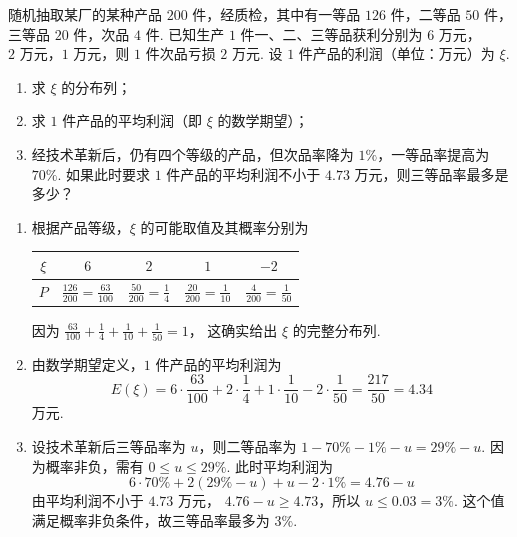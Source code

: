 \begin{problem}
随机抽取某厂的某种产品 \(200\text{ 件}\)，经质检，其中有一等品 \(126\text{ 件}\)，二等品 \(50\text{ 件}\)，三等品 \(20\text{ 件}\)，次品 \(4\text{ 件}\). 已知生产 \(1\text{ 件}\)一、二、三等品获利分别为 \(6\text{ 万元}\)，\(2\text{ 万元}\)，\(1\text{ 万元}\)，则 \(1\text{ 件}\)次品亏损 \(2\text{ 万元}\). 设 \(1\text{ 件}\)产品的利润（单位：万元）为 \(\xi\).

\begin{enumerate}
\item 求 \(\xi\) 的分布列；
\item 求 \(1\text{ 件}\)产品的平均利润（即 \(\xi\) 的数学期望）；
\item 经技术革新后，仍有四个等级的产品，但次品率降为 \(1\%\)，一等品率提高为 \(70\%\). 如果此时要求 \(1\text{ 件}\)产品的平均利润不小于 \(4.73\text{ 万元}\)，则三等品率最多是多少？
\end{enumerate}
\end{problem}

\begin{solution}
\begin{enumerate}
\item 根据产品等级，\(\xi\) 的可能取值及其概率分别为
\begin{center}
\begin{tabular}{c|cccc}
\(\xi\) & \(6\) & \(2\) & \(1\) & \(-2\)\\
\hline
\(P\) & \(\frac{126}{200}=\frac{63}{100}\)
& \(\frac{50}{200}=\frac14\)
& \(\frac{20}{200}=\frac1{10}\)
& \(\frac4{200}=\frac1{50}\)
\end{tabular}
\end{center}
因为 \(\frac{63}{100}+\frac14+\frac1{10}+\frac1{50}=1\)，
这确实给出 \(\xi\) 的完整分布列.

\item 由数学期望定义，\(1\) 件产品的平均利润为
\[
E(\xi)=6\cdot\frac{63}{100}+2\cdot\frac14+1\cdot\frac1{10}-2\cdot\frac1{50}
=\frac{217}{50}=4.34
\]
万元.

\item 设技术革新后三等品率为 \(u\)，则二等品率为
\(1-70\%-1\%-u=29\%-u\). 因为概率非负，需有 \(0\leqslant u\leqslant29\%\).
此时平均利润为
\[
6\cdot70\%+2(29\%-u)+u-2\cdot1\%
=4.76-u
\]
由平均利润不小于 \(4.73\) 万元，
\(4.76-u\geqslant4.73\)，所以 \(u\leqslant0.03=3\%\).
这个值满足概率非负条件，故三等品率最多为 \(3\%\).
\end{enumerate}
\end{solution}

